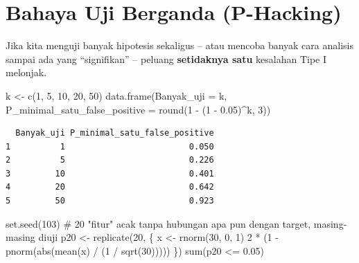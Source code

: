 \documentclass[
  indonesian,
  letterpaper,
]{book}
\newenvironment{Shaded}{\begin{snugshade}}{\end{snugshade}}
\newcommand{\AttributeTok}[1]{\textcolor[rgb]{0.40,0.45,0.13}{#1}}
\newcommand{\CommentTok}[1]{\textcolor[rgb]{0.37,0.37,0.37}{#1}}
\newcommand{\DecValTok}[1]{\textcolor[rgb]{0.68,0.00,0.00}{#1}}
\newcommand{\FloatTok}[1]{\textcolor[rgb]{0.68,0.00,0.00}{#1}}
\newcommand{\FunctionTok}[1]{\textcolor[rgb]{0.28,0.35,0.67}{#1}}
\newcommand{\NormalTok}[1]{\textcolor[rgb]{0.00,0.23,0.31}{#1}}
\newcommand{\OtherTok}[1]{\textcolor[rgb]{0.00,0.23,0.31}{#1}}
\newcommand{\SpecialCharTok}[1]{\textcolor[rgb]{0.37,0.37,0.37}{#1}}
\begin{document}
\section{Bahaya Uji Berganda
(P-Hacking)}\label{bahaya-uji-berganda-p-hacking}

Jika kita menguji banyak hipotesis sekaligus -- atau mencoba banyak cara
analisis sampai ada yang ``signifikan'' -- peluang \textbf{setidaknya
satu} kesalahan Tipe I melonjak.

\begin{Shaded}
\begin{Highlighting}[]
\NormalTok{k }\OtherTok{\textless{}{-}} \FunctionTok{c}\NormalTok{(}\DecValTok{1}\NormalTok{, }\DecValTok{5}\NormalTok{, }\DecValTok{10}\NormalTok{, }\DecValTok{20}\NormalTok{, }\DecValTok{50}\NormalTok{)}
\FunctionTok{data.frame}\NormalTok{(}\AttributeTok{Banyak\_uji =}\NormalTok{ k,}
           \AttributeTok{P\_minimal\_satu\_false\_positive =} \FunctionTok{round}\NormalTok{(}\DecValTok{1} \SpecialCharTok{{-}}\NormalTok{ (}\DecValTok{1} \SpecialCharTok{{-}} \FloatTok{0.05}\NormalTok{)}\SpecialCharTok{\^{}}\NormalTok{k, }\DecValTok{3}\NormalTok{))}
\end{Highlighting}
\end{Shaded}

\begin{verbatim}
  Banyak_uji P_minimal_satu_false_positive
1          1                         0.050
2          5                         0.226
3         10                         0.401
4         20                         0.642
5         50                         0.923
\end{verbatim}

\begin{Shaded}
\begin{Highlighting}[]
\FunctionTok{set.seed}\NormalTok{(}\DecValTok{103}\NormalTok{)}
\CommentTok{\# 20 "fitur" acak tanpa hubungan apa pun dengan target, masing{-}masing diuji}
\NormalTok{p20 }\OtherTok{\textless{}{-}} \FunctionTok{replicate}\NormalTok{(}\DecValTok{20}\NormalTok{, \{}
\NormalTok{  x }\OtherTok{\textless{}{-}} \FunctionTok{rnorm}\NormalTok{(}\DecValTok{30}\NormalTok{, }\DecValTok{0}\NormalTok{, }\DecValTok{1}\NormalTok{)}
  \DecValTok{2} \SpecialCharTok{*}\NormalTok{ (}\DecValTok{1} \SpecialCharTok{{-}} \FunctionTok{pnorm}\NormalTok{(}\FunctionTok{abs}\NormalTok{(}\FunctionTok{mean}\NormalTok{(x) }\SpecialCharTok{/}\NormalTok{ (}\DecValTok{1} \SpecialCharTok{/} \FunctionTok{sqrt}\NormalTok{(}\DecValTok{30}\NormalTok{)))))}
\NormalTok{\})}
\FunctionTok{sum}\NormalTok{(p20 }\SpecialCharTok{\textless{}=} \FloatTok{0.05}\NormalTok{)}
\end{Highlighting}
\end{Shaded}
\end{document}
